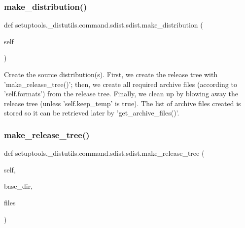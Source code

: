 \subsubsection{\texorpdfstring{make\+\_\+distribution()}{make\_distribution()}}
{\footnotesize\ttfamily def setuptools.\+\_\+distutils.\+command.\+sdist.\+sdist.\+make\+\_\+distribution (\begin{DoxyParamCaption}\item[{}]{self }\end{DoxyParamCaption})}

\begin{DoxyVerb}Create the source distribution(s).  First, we create the release
tree with 'make_release_tree()'; then, we create all required
archive files (according to 'self.formats') from the release tree.
Finally, we clean up by blowing away the release tree (unless
'self.keep_temp' is true).  The list of archive files created is
stored so it can be retrieved later by 'get_archive_files()'.
\end{DoxyVerb}
 \mbox{\label{classsetuptools_1_1__distutils_1_1command_1_1sdist_1_1sdist_a124114db5167df9b9530789bc8d6386e}} 
\subsubsection{\texorpdfstring{make\+\_\+release\+\_\+tree()}{make\_release\_tree()}}
{\footnotesize\ttfamily def setuptools.\+\_\+distutils.\+command.\+sdist.\+sdist.\+make\+\_\+release\+\_\+tree (\begin{DoxyParamCaption}\item[{}]{self,  }\item[{}]{base\+\_\+dir,  }\item[{}]{files }\end{DoxyParamCaption})}

